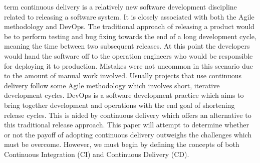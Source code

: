 \documentclass[10pt,journal,compsoc]{IEEEtran}
\begin{document}
% 
% 
% 
% 
 term continuous delivery is a relatively new software development discipline related to releasing a software system. It is closely associated with both the Agile methodology and DevOps. The traditional approach of releasing a product would be to perform testing and bug fixing towards the end of a long development cycle, meaning the time between two subsequent releases. At this point the developers would hand the software off to the operation engineers who would be responsible for deploying it to production. Mistakes were not uncommon in this scenario due to the amount of manual work involved. Usually projects that use continuous delivery follow some Agile methodology which involves short, iterative development cycles. DevOps is a software development practice which aims to bring together development and operations with the end goal of shortening release cycles. This is aided by continuous delivery which offers an alternative to this traditional release approach. This paper will attempt to determine whether or not the payoff of adopting continuous delivery outweighs the challenges which must be overcome. However, we must begin by defining the concepts of both Continuous Integration (CI) and Continuous Delivery (CD).
\end{document}
